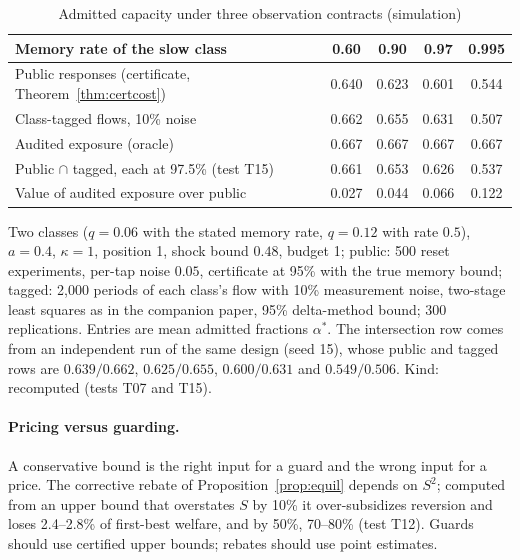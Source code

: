 \begin{table}[t]\centering\small
\begin{threeparttable}
\caption{Admitted capacity under three observation contracts (simulation)}\label{tab:discsim}
\begin{tabular}{lcccc}
\toprule
Memory rate of the slow class & 0.60 & 0.90 & 0.97 & 0.995\\
\midrule
Public responses (certificate, Theorem~\ref{thm:certcost}) & 0.640 & 0.623 & 0.601 & 0.544\\
Class-tagged flows, 10\% noise & 0.662 & 0.655 & 0.631 & 0.507\\
Audited exposure (oracle) & 0.667 & 0.667 & 0.667 & 0.667\\
Public $\cap$ tagged, each at 97.5\% (test T15) & 0.661 & 0.653 & 0.626 & 0.537\\
\midrule
Value of audited exposure over public & 0.027 & 0.044 & 0.066 & 0.122\\
\bottomrule
\end{tabular}
\begin{tablenotes}\footnotesize\item Two classes ($q=0.06$ with the stated memory rate, $q=0.12$ with rate $0.5$), $a=0.4$, $\kappa=1$, position 1, shock bound $0.48$, budget 1; public: 500 reset experiments, per-tap noise $0.05$, certificate at 95\% with the true memory bound; tagged: 2{,}000 periods of each class's flow with 10\% measurement noise, two-stage least squares as in the companion paper, 95\% delta-method bound; 300 replications. Entries are mean admitted fractions $\alpha^*$. The intersection row comes from an independent run of the same design (seed 15), whose public and tagged rows are $0.639/0.662$, $0.625/0.655$, $0.600/0.631$ and $0.549/0.506$. Kind: recomputed (tests T07 and T15).\end{tablenotes}
\end{threeparttable}
\end{table}

\paragraph{Pricing versus guarding.} A conservative bound is the right input for a guard and the wrong input for a price. The corrective rebate of Proposition~\ref{prop:equil} depends on $S^2$; computed from an upper bound that overstates $S$ by 10\% it over-subsidizes reversion and loses 2.4--2.8\% of first-best welfare, and by 50\%, 70--80\% (test T12). Guards should use certified upper bounds; rebates should use point estimates.

